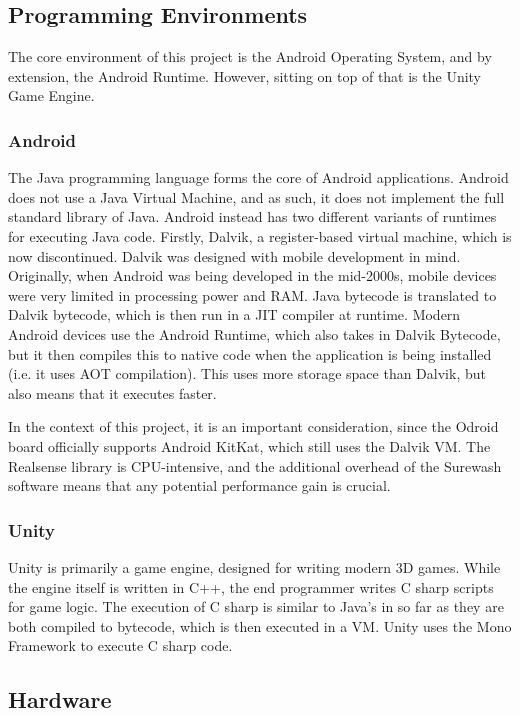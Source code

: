     \subsection{Programming Environments}
    The core environment of this project is the Android Operating System, and by extension, the Android Runtime. However, sitting on top of that is the Unity Game Engine.
        \subsubsection{Android}
        The Java programming language forms the core of Android applications. Android does not use a Java Virtual Machine, and as such, it does not implement the full standard library of Java. Android instead has two different variants of runtimes for executing Java code. Firstly, Dalvik, a register-based virtual machine, which is now discontinued. Dalvik was designed with mobile development in mind. Originally, when Android was being developed in the mid-2000s, mobile devices were very limited in processing power and RAM. Java bytecode is translated to Dalvik bytecode, which is then run in a JIT compiler at runtime. Modern Android devices use the Android Runtime, which also takes in Dalvik Bytecode, but it then compiles this to native code when the application is being installed (i.e. it uses AOT compilation). This uses more storage space than Dalvik, but also means that it executes faster.

        In the context of this project, it is an important consideration, since the Odroid board officially supports Android KitKat, which still uses the Dalvik VM. The Realsense library is CPU-intensive, and the additional overhead of the Surewash software means that any potential performance gain is crucial.
        \subsubsection{Unity}
        Unity is primarily a game engine, designed for writing modern 3D games. While the engine itself is written in C++, the end programmer writes C sharp scripts for game logic. The execution of C sharp is similar to Java's in so far as they are both compiled to bytecode, which is then executed in a VM. Unity uses the Mono Framework to execute C sharp code.
    
    \subsection{Hardware}
